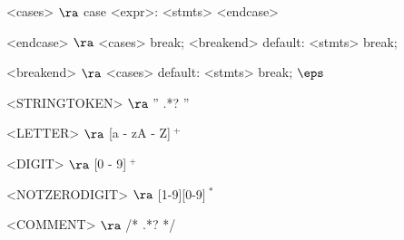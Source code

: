 \begin{grammar}
<cases> $\ra$ case <expr>:
			<stmts>
		<endcase>
		
<endcase> $\ra$ <cases>
		\alt break; <breakend>
		\alt default:
			<stmts>
			break;

<breakend> $\ra$ <cases>
\alt default:
<stmts>
break;
\alt$\eps$

<STRINGTOKEN> $\ra$ '' .*? '' 

<LETTER> $\ra$ [a - zA - Z]$~^+$

<DIGIT> $\ra$ [0 - 9]$~^+$

<NOTZERODIGIT> $\ra$ [1-9][0-9]$~^*$

<COMMENT> $\ra$ /* .*? */


\end{grammar}